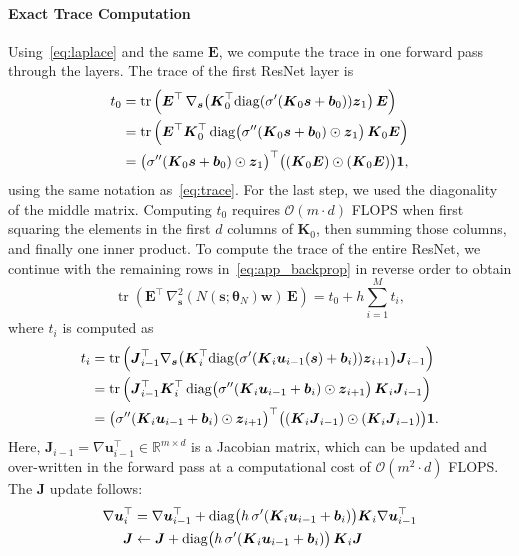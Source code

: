 \documentclass[letterpaper]{article}
\newcommand{\bfth}{\boldsymbol{\theta}}
\newcommand{\bfb}{\boldsymbol{b}}
\newcommand{\bfs}{\boldsymbol{s}}
\newcommand{\bfu}{\boldsymbol{u}}
\newcommand{\bfw}{\boldsymbol{w}}
\newcommand{\bfz}{\boldsymbol{z}}
\newcommand{\bfE}{\boldsymbol{E}}
\newcommand{\bfJ}{\boldsymbol{J}}
\newcommand{\bfK}{\boldsymbol{K}}
\def\tr{\operatorname{tr}}
\newcommand{\R}{\ensuremath{\mathds{R}}}
\newcommand{\bigO}{\ensuremath{\mathcal{O}}}
\begin{document}
\paragraph{Exact Trace Computation} 
	
	Using~\eqref{eq:laplace} and the same $\bfE$, we compute the trace in one forward pass through the layers.
	The trace of the first ResNet layer is
	\begin{equation}
	\begin{split}
	    t_0  & = \tr \Big( \bfE^\top \, \nabla_{\bfs} \big( \bfK_0^\top {\rm diag}(\sigma'(\bfK_0 \bfs + \bfb_0)) \bfz_1\big) \, \bfE \Big)\\
	         & = \tr \left(\bfE^\top \bfK_0^\top \, {\rm diag} \big(\sigma''(\bfK_0 \bfs + \bfb_0) \odot \bfz_1 \big) \, \bfK_0 \bfE \right)\\
	         & = \big(\sigma''(\bfK_0 \bfs + \bfb_0) \odot \bfz_1\big)^\top \big((\bfK_0 \bfE)\odot(\bfK_0 \bfE)\big) \mathbf{1},
	\end{split}
	\end{equation}
	using the same notation as~\eqref{eq:trace}. For the last step, we used the diagonality of the middle matrix.
	Computing $t_0$ requires $\mathcal{O}(m\cdot d)$ FLOPS when first squaring the elements in the first $d$ columns of $\bfK_0$, then summing those columns, and finally one inner product. 
	To compute the trace of the entire ResNet, we continue with the remaining rows in~\eqref{eq:app_backprop} in reverse order to obtain
	\begin{equation}
	    \tr \left( \bfE^\top \, \nabla_{\bfs}^2 ( N(\bfs;\bfth_N) \bfw) \, \bfE \right) = t_0 + h \sum_{i=1}^M t_i,
	\end{equation}
	where $t_i$ is computed as
	 \begin{equation*}
	    \begin{split}
	        t_i & = \tr \left(\bfJ_{i-1}^\top \nabla_{\bfs} \big( \bfK_i^\top {\rm diag}(\sigma'(\bfK_i \bfu_{i-1}(\bfs) + \bfb_i)) \bfz_{i+1} \big) \bfJ_{i-1}\right) \\
	           & = \tr \left(\bfJ_{i-1}^\top \bfK_i^\top \,{\rm diag} \big(\sigma''(\bfK_i \bfu_{i-1} + \bfb_i) \odot \bfz_{i+1} \big) \, \bfK_i \bfJ_{i-1} \right)\\
	           & = \big(\sigma''(\bfK_i \bfu_{i-1} + \bfb_i) \odot \bfz_{i+1}\big)^\top \big((\bfK_i \bfJ_{i-1})\odot(\bfK_i \bfJ_{i-1})\big) \mathbf{1}.
	    \end{split}
	\end{equation*}
	Here, $\bfJ_{i-1} = \nabla \bfu_{i-1}^\top \in \R^{m\times d}$ is a Jacobian matrix, which can be updated and over-written in the forward pass at a computational cost of $\bigO(m^2 \cdot d)$ FLOPS.
	The $\bfJ$ update follows:
	\begin{equation}
	  \begin{aligned}
	      \nabla \bfu_i^\top &= \nabla \bfu_{i-1}^\top + {\rm diag} \big( h \, \sigma' ( \bfK_i \bfu_{i-1} + \bfb_i) \big) \bfK_i  \nabla \bfu_{i-1}^\top \\
	      \bfJ &\leftarrow \bfJ + {\rm diag} \big( h \, \sigma' ( \bfK_i \bfu_{i-1} + \bfb_i) \big) \, \bfK_i \bfJ
	  \end{aligned}
	\end{equation}
 
\end{document}
